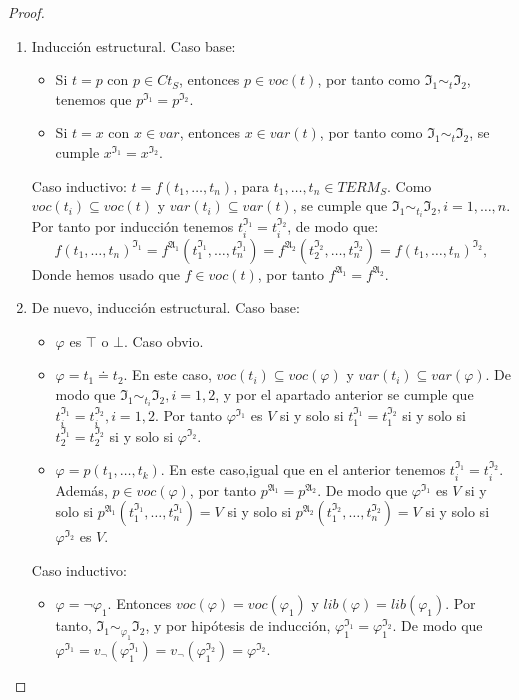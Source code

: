 \begin{proof}\mbox{}
\begin{enumerate}
    \item Inducción estructural.
    Caso base:
    \begin{itemize}
        \item Si $t=p$ con $p\in Ct_S$, entonces $p\in voc(t)$, por tanto como $\mathfrak{I}_{1} \sim_{t} \mathfrak{I}_{2}$, tenemos que $p^{\mathfrak{I}_1}=p^{\mathfrak{I}_2}$.
        \item Si $t=x$ con $x\in var$, entonces $x\in var(t)$, por tanto como $\mathfrak{I}_{1} \sim_{t} \mathfrak{I}_{2}$, se cumple $x^{\mathfrak{I}_1}=x^{\mathfrak{I}_2}$.
    \end{itemize} 
    Caso inductivo: $t=f(t_1,\dots,t_n)$, para $t_1,\dots,t_n\in TERM_S.$ Como $voc(t_i)\subseteq voc(t)$ y $var(t_i)\subseteq var(t)$, se cumple que $\mathfrak{I}_{1} \sim_{t_i} \mathfrak{I}_{2}, i=1,\dots,n$.\\
    Por tanto por inducción tenemos $t_i^{\mathfrak{I}_1}=t_i^{\mathfrak{I}_2}$, de modo que:
    $$f(t_1,\dots,t_n)^{\mathfrak{I}_1}=f^{\mathfrak{A}_1}(t_1^{\mathfrak{I}_1},\dots,t_n^{\mathfrak{I}_1})=f^{\mathfrak{A}_2}(t_2^{\mathfrak{I}_2},\dots,t_n^{\mathfrak{I}_2})=f(t_1,\dots,t_n)^{\mathfrak{I}_2},$$
    Donde hemos usado que $f\in voc(t)$, por tanto $f^{\mathfrak{A}_1}=f^{\mathfrak{A}_2}$.
    \item De nuevo, inducción estructural.
    Caso base:
    \begin{itemize}
        \item $\varphi$ es $\top$ o $\bot$. Caso obvio.
        \item $\varphi=t_1\doteq t_2$. En este caso, $voc(t_i)\subseteq voc(\varphi)$ y $var(t_i)\subseteq var(\varphi)$. De modo que $\mathfrak{I}_{1} \sim_{t_i} \mathfrak{I}_{2}, i=1,2$, y por el apartado anterior se cumple que $t_i^{\mathfrak{I}_{1}} = t_i^{\mathfrak{I}_{2}},i=1,2$. Por tanto $\varphi^{\mathfrak{I}_1}$ es $V$ si y solo si $t_1^{\mathfrak{I}_{1}} = t_1^{\mathfrak{I}_{2}}$ si y solo si $t_2^{\mathfrak{I}_{1}} = t_2^{\mathfrak{I}_{2}}$ si y solo si $\varphi^{\mathfrak{I}_2}$.
        \item $\varphi=p(t_1,\dots,t_k)$. En este caso,igual que en el anterior tenemos $t_i^{\mathfrak{I}_1}=t_i^{\mathfrak{I}_2}$. Además, $p\in voc(\varphi)$, por tanto $p^{\mathfrak{A}_1}=p^{\mathfrak{A}_2}$. De modo que $\varphi^{\mathfrak{I}_1}$ es $V$ si y solo si $p^{\mathfrak{A}_1}(t_1^{\mathfrak{I}_1},\dots,t_n^{\mathfrak{I}_1})=V$ si y solo si $p^{\mathfrak{A}_2}(t_1^{\mathfrak{I}_2},\dots,t_n^{\mathfrak{I}_2})=V$ si y solo si $\varphi^{\mathfrak{I}_2}$ es $V$.
    \end{itemize}
    Caso inductivo:
    \begin{itemize}
        \item $\varphi=\neg\varphi_1$. Entonces $voc(\varphi)=voc(\varphi_1)$ y $lib(\varphi)=lib(\varphi_1)$. Por tanto, $\mathfrak{I}_{1} \sim_{\varphi_1} \mathfrak{I}_{2}$, y por hipótesis de inducción, $\varphi_1^{\mathfrak{I}_1}=\varphi_1^{\mathfrak{I}_2}$. De modo que
        $\varphi^{\mathfrak{I}_1}=v_\neg(\varphi_1^{\mathfrak{I}_1})=v_\neg(\varphi_1^{\mathfrak{I}_2})=\varphi^{\mathfrak{I}_2}$.
        

\end{itemize}
\end{enumerate}
\end{proof}
